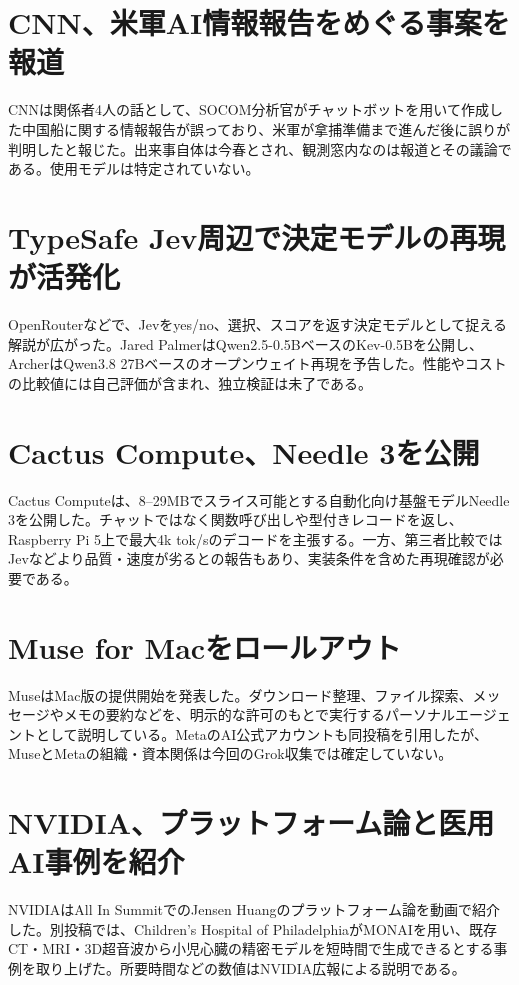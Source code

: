 \section{CNN、米軍AI情報報告をめぐる事案を報道}
CNNは関係者4人の話として、SOCOM分析官がチャットボットを用いて作成した中国船に関する情報報告が誤っており、米軍が拿捕準備まで進んだ後に誤りが判明したと報じた。出来事自体は今春とされ、観測窓内なのは報道とその議論である。使用モデルは特定されていない。

\section{TypeSafe Jev周辺で決定モデルの再現が活発化}
OpenRouterなどで、Jevをyes/no、選択、スコアを返す決定モデルとして捉える解説が広がった。Jared PalmerはQwen2.5-0.5BベースのKev-0.5Bを公開し、ArcherはQwen3.8 27Bベースのオープンウェイト再現を予告した。性能やコストの比較値には自己評価が含まれ、独立検証は未了である。

\section{Cactus Compute、Needle 3を公開}
Cactus Computeは、8--29MBでスライス可能とする自動化向け基盤モデルNeedle 3を公開した。チャットではなく関数呼び出しや型付きレコードを返し、Raspberry Pi 5上で最大4k tok/sのデコードを主張する。一方、第三者比較ではJevなどより品質・速度が劣るとの報告もあり、実装条件を含めた再現確認が必要である。

\section{Muse for Macをロールアウト}
MuseはMac版の提供開始を発表した。ダウンロード整理、ファイル探索、メッセージやメモの要約などを、明示的な許可のもとで実行するパーソナルエージェントとして説明している。MetaのAI公式アカウントも同投稿を引用したが、MuseとMetaの組織・資本関係は今回のGrok収集では確定していない。

\section{NVIDIA、プラットフォーム論と医用AI事例を紹介}
NVIDIAはAll In SummitでのJensen Huangのプラットフォーム論を動画で紹介した。別投稿では、Children's Hospital of PhiladelphiaがMONAIを用い、既存CT・MRI・3D超音波から小児心臓の精密モデルを短時間で生成できるとする事例を取り上げた。所要時間などの数値はNVIDIA広報による説明である。

